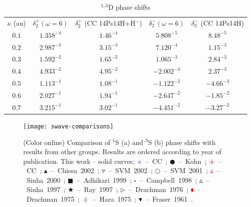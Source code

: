 \documentclass[preprint,showpacs,preprintnumbers,amsmath,amssymb,longbibliography,pra,aps]{revtex4-1}
\begin{document}
\begin{table}[H]
\begin{center}
\begin{ruledtabular}
\begin{tabular}{c c c c c}
$\kappa$ (au) & $\delta_2^+ (\omega = 6)$ & $\delta_2^+$ (CC 14Ps14H+H$^-$) \cite{Walters2004} & $\delta_2^- (\omega = 6)$ & $\delta_2^-$ (CC 14Ps14H) \cite{Blackwood2002} \\
\colrule
$0.1$ & $1.358^{-4}$ & $1.46^{-4}$ & $5.808^{-5}$ & $8.48^{-5}$ \\
$0.2$ & $2.987^{-3}$ & $3.15^{-3}$ & $7.120^{-4}$ & $1.15^{-3}$ \\
$0.3$ & $1.592^{-2}$ & $1.65^{-2}$ & $1.065^{-3}$ & $2.84^{-3}$ \\
$0.4$ & $4.933^{-2}$ & $4.95^{-2}$ & $-2.002^{-3}$ & $2.37^{-3}$ \\
$0.5$ & $1.113^{-1}$ & $1.08^{-1}$ & $-1.122^{-2}$ & $-4.66^{-3}$ \\
$0.6$ & $2.027^{-1}$ & $1.94^{-1}$ & $-2.647^{-2}$ & $-1.85^{-2}$ \\
$0.7$ & $3.215^{-1}$ & $3.02^{-1}$ & $-4.451^{-2}$ & $-3.27^{-2}$ \\
\end{tabular}
\end{ruledtabular}
\caption{$^{1,3}$D phase shifts}
\label{tab:DWavePhase}
\end{center}
\end{table}



\begin{figure}[H]
	\centering
	\texttt{[image: swave-comparisons]}
	\caption{(Color online) Comparison of $^1$S (a) and $^3$S (b) phase shifts with results from other groups. Results are ordered according to year of publication. This work -- solid curves; \mbox{\textcolor{blue}{$\times$} -- CC \cite{Walters2004};} \mbox{$\CIRCLE$ -- Kohn \cite{VanReeth2003};} \mbox{\textcolor{red}{\textbf{+}} -- CC \cite{Blackwood2002};} \mbox{$\blacktriangle$ -- Chiesa 2002 \cite{Chiesa2002};} \mbox{$\triangledown$ -- SVM 2002 \cite{Ivanov2002};} \mbox{$\Circle$ -- SVM 2001 \cite{Ivanov2001};} \mbox{\textcolor{red}{$\vartriangle$} -- Sinha 2000 \cite{Sinha2000};} \mbox{$\blacksquare$ -- Adhikari 1999 \cite{Adhikari1999};} \mbox{$\square$ -- Campbell 1998 \cite{Campbell1998};} \mbox{$\vartriangle$ -- Sinha 1997 \cite{Sinha1997};} \mbox{\textcolor[RGB]{0,127,0}{$\bigstar$} -- Ray 1997 \cite{Ray1997};} \mbox{$\triangleright$ -- Drachman 1976 \cite{Drachman1976};} \mbox{\textcolor{red}{$\blacklozenge$} -- Drachman 1975 \cite{Drachman1975};} \mbox{\textcolor{blue}{$\lozenge$} -- Hara 1975 \cite{Hara1975};} \mbox{$\blacktriangledown$ -- Fraser 1961 \cite{Fraser1961}.}}
	\label{fig:swave-comparisons}
\end{figure}
\end{document}
